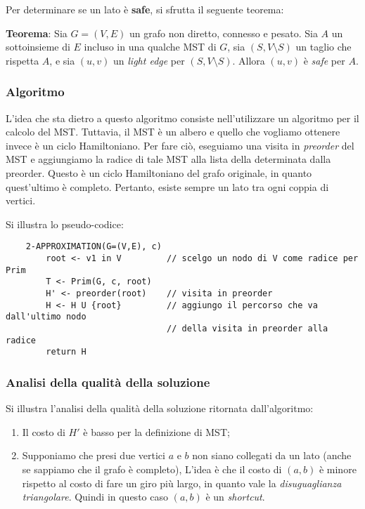 Per determinare se un lato è \textbf{safe}, si sfrutta il seguente teorema:

\textbf{Teorema}: Sia $G = (V, E)$ un grafo non diretto, connesso e pesato. Sia $A$ un
sottoinsieme di $E$ incluso in una qualche MST di $G$, sia $(S, V \setminus S)$ un
taglio che rispetta $A$, e sia $(u, v)$ un \textit{light edge} per $(S, V \setminus S)$.
Allora $(u, v)$ è \textit{safe} per $A$.

\subsubsection{Algoritmo}

L'idea che sta dietro a questo algoritmo consiste nell'utilizzare un algoritmo per il calcolo
del MST. Tuttavia, il MST è un albero e quello che vogliamo ottenere invece è un
ciclo Hamiltoniano. Per fare ciò, eseguiamo una visita in \textit{preorder} del MST
e aggiungiamo la radice di tale MST alla lista della determinata dalla preorder. Questo è un ciclo
Hamiltoniano del grafo originale, in quanto quest'ultimo è completo. Pertanto, esiste sempre un
lato tra ogni coppia di vertici.

Si illustra lo pseudo-codice:
\begin{verbatim}
    2-APPROXIMATION(G=(V,E), c)
        root <- v1 in V         // scelgo un nodo di V come radice per Prim
        T <- Prim(G, c, root)
        H' <- preorder(root)    // visita in preorder
        H <- H U {root}         // aggiungo il percorso che va dall'ultimo nodo
                                // della visita in preorder alla radice
        return H

\end{verbatim}

\subsubsection{Analisi della qualità della soluzione}

Si illustra l'analisi della qualità della soluzione ritornata dall'algoritmo:
\begin{enumerate}
    \item Il costo di $H'$ è basso per la definizione di MST;
    \item Supponiamo che presi due vertici $a$ e $b$ non siano collegati da un lato (anche se
    sappiamo che il grafo è completo), L'idea è che il costo di $(a, b)$ è minore rispetto
    al costo di fare un giro più largo, in quanto vale la \textit{disuguaglianza triangolare}.
    Quindi in questo caso $(a, b)$ è un \textit{shortcut}.
\end{enumerate}

